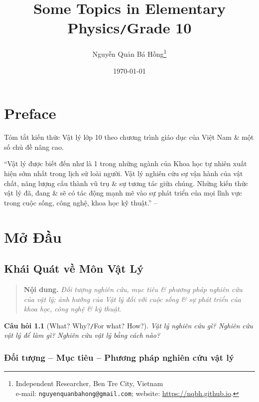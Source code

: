 \documentclass[oneside]{book}
\title{Some Topics in Elementary Physics\texttt{/}Grade 10}
\author{Nguyễn Quản Bá Hồng\footnote{Independent Researcher, Ben Tre City, Vietnam\\e-mail: \texttt{nguyenquanbahong@gmail.com}; website: \url{https://nqbh.github.io}.}}
\date{\today}
\numberwithin{equation}{section}
\newtheorem{cauhoi}{Câu hỏi}[section]
\begin{document}
\frontmatter
\maketitle
\setcounter{secnumdepth}{4}
\setcounter{tocdepth}{3}
\tableofcontents
\newpage


\mainmatter

\chapter*{Preface}

Tóm tắt kiến thức Vật lý lớp 10 theo chương trình giáo dục của Việt Nam \& một số chủ đề nâng cao.

``Vật lý được biết đến như là 1 trong những ngành của Khoa học tự nhiên xuất hiện sớm nhất trong lịch sử loài người. Vật lý nghiên cứu sự vận hành của vật chất, năng lượng cấu thành vũ trụ \& sự tương tác giữa chúng. Những kiến thức vật lý đã, đang \& sẽ có tác động mạnh mẽ vào sự phát triển của mọi lĩnh vực trong cuộc sống, công nghệ, khoa học kỹ thuật.'' -- \cite[p. 3]{SGK_Vat_Ly_10_Chan_Troi_Sang_Tao}


\chapter{Mở Đầu}

\section{Khái Quát về Môn Vật Lý}

\begin{quotation}
	\textbf{Nội dung.} \textit{Đối tượng nghiên cứu, mục tiêu \& phương pháp nghiên cứu của vật lý; ảnh hưởng của Vật lý đối với cuộc sống \& sự phát triển của khoa học, công nghệ \& kỹ thuật}.
\end{quotation}

\begin{cauhoi}[What? Why?\texttt{/}For what? How?]
	Vật lý nghiên cứu gì? Nghiên cứu vật lý để làm gì? Nghiên cứu vật lý bằng cách nào?
\end{cauhoi}

\subsection{Đối tượng -- Mục tiêu -- Phương pháp nghiên cứu vật lý}
\end{document}
